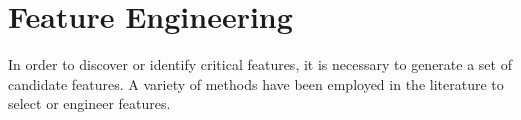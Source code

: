 

\begin{comment}
Since terminology across research domains can vary, I will define the terms in which I will describe previous research and my own: 
\begin{itemize}
\item A solution is code that a particular person wrote in response to a prompt or problem description.
\item Solution clusters represent different patterns of implementation. For example, there may be two distinct solution clusters, both achieving the same input-output behavior but by different means. 
\item A solution path is a series of code snapshots generated while a person is working toward meeting a particular input-output behavior specification. 
\item The ``space of student solutions'' refers to the aggregation of student-generated solutions and the solution clusters they form.
\end{itemize}
\end{comment}


\section{Feature Engineering}

In order to discover or identify critical features, it is necessary to generate a set of candidate features. A variety of methods have been employed in the literature to select or engineer features. 



